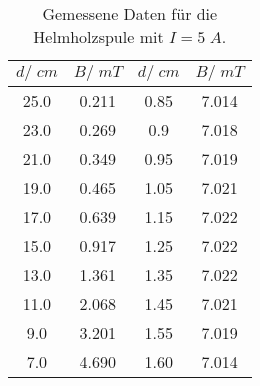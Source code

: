 \begin{table}[H]
  \centering
   \begin{tabular}{c c| c c}
    \toprule
    $d /\;\si{cm}$ & $B/\;\si{mT}$ &
    $d /\;\si{cm}$ & $B/\;\si{mT}$\\
    \midrule
    25.0 & 0.211 & 0.85 & 7.014\\
    23.0 & 0.269 & 0.9 & 7.018\\
    21.0 & 0.349 & 0.95 & 7.019\\
    19.0 & 0.465 & 1.05 & 7.021\\
    17.0 & 0.639 & 1.15 & 7.022\\
    15.0 & 0.917 & 1.25 & 7.022\\
    13.0 & 1.361 & 1.35 & 7.022\\
    11.0 & 2.068 & 1.45 & 7.021\\
    9.0 & 3.201 & 1.55 & 7.019\\
    7.0 & 4.690 & 1.60 & 7.014\\
   \bottomrule
  \end{tabular}
  \caption{Gemessene Daten für die Helmholzspule mit $I=5\;\si{A}$.}
  \label{tab:tabelle4}
\end{table}
